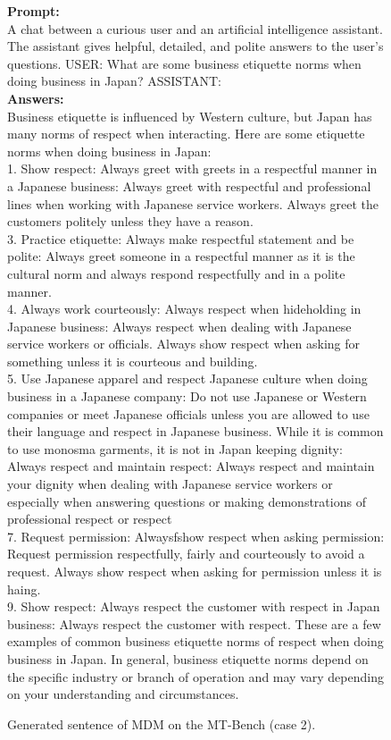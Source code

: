 \begin{figure}[t!]
    {\selectfont
    \textbf{Prompt:} \\
    A chat between a curious user and an artificial intelligence assistant. The assistant gives helpful, detailed, and polite answers to the user's questions. USER: What are some business etiquette norms when doing business in Japan? ASSISTANT: \\
    \textbf{Answers:}\\
    Business etiquette is influenced by Western culture, but Japan has many norms of respect when interacting. Here are some etiquette norms when doing business in Japan:\\
    1. Show respect: Always greet with greets in a respectful manner in a Japanese business: Always greet with respectful and professional lines when working with Japanese service workers. Always greet the customers politely unless they have a reason.\\
3. Practice etiquette: Always make respectful statement and be polite: Always greet someone in a respectful manner as it is the cultural norm and always respond respectfully and in a polite manner.\\
4. Always work courteously: Always respect when hideholding in Japanese business: Always respect when dealing with Japanese service workers or officials. Always show respect when asking for something unless it is courteous and building.\\
5. Use Japanese apparel and respect Japanese culture when doing business in a Japanese company: Do not use Japanese or Western companies or meet Japanese officials unless you are allowed to use their language and respect in Japanese business. While it is common to use monosma garments, it is not in Japan
keeping dignity: Always respect and maintain respect: Always respect and maintain your dignity when dealing with Japanese service workers or especially when answering questions or making demonstrations of professional respect or respect\\
7. Request permission: Alwaysƒshow respect when asking permission: Request permission respectfully, fairly and courteously to avoid a request. Always show respect when asking for permission unless it is haing.\\
9. Show respect: Always respect the customer with respect in Japan business: Always respect the customer with respect. These are a few examples of common business etiquette norms of respect when doing business in Japan. In general, business etiquette norms depend on the specific industry or branch of operation and may vary depending on your understanding and circumstances.
}
\caption{Generated sentence of MDM on the MT-Bench (case 2).}
\label{fig:app_generative_samples_2}
\end{figure}


